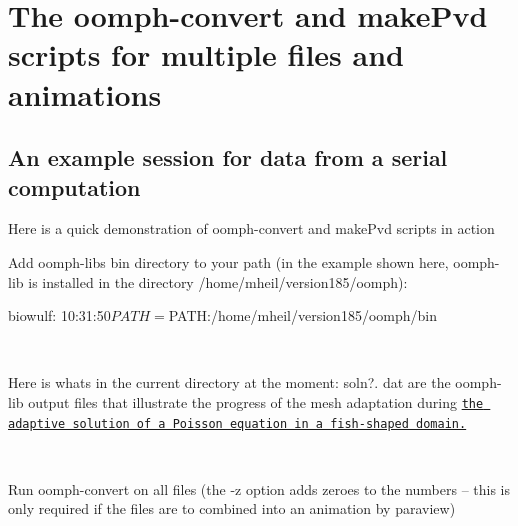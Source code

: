  

\hypertarget{index_py_mult}{}\section{The oomph-\/convert and make\+Pvd scripts for multiple files and animations}\label{index_py_mult}
\hypertarget{index_py_sample_mult}{}\subsection{An example session for data from a serial computation}\label{index_py_sample_mult}
Here is a quick demonstration of {\ttfamily oomph-\/convert} and {\ttfamily make\+Pvd} scripts in action


\begin{DoxyEnumerate}
\item Add {\ttfamily oomph-\/lib\textquotesingle{}s} bin directory to your path (in the example shown here, {\ttfamily oomph-\/lib} is installed in the directory {\ttfamily /home/mheil/version185/oomph})\+: ~\newline
~\newline

\begin{DoxyCode}
biowulf: 10:31:50$ PATH=$PATH:/home/mheil/version185/oomph/bin
\end{DoxyCode}
 ~\newline

\item Here is what\textquotesingle{}s in the current directory at the moment\+: {\ttfamily soln}?. {\ttfamily dat} are the {\ttfamily oomph-\/lib} output files that illustrate the progress of the mesh adaptation during \href{../../poisson/fish_poisson/html/index.html}{\tt the adaptive solution of a Poisson equation in a fish-\/shaped domain.} ~\newline
~\newline

 ~\newline

\item Run {\ttfamily oomph-\/convert} on all files (the -\/z option adds zeroes to the numbers -- this is only required if the files are to combined into an animation by paraview) ~\newline
~\newline


\end{DoxyEnumerate}
